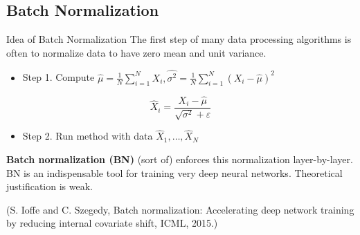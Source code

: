 \subsection{Batch Normalization}

\begin{frame}[allowframebreaks]

\begin{myconceptblock}{6.45}{Idea of Batch Normalization}
    The first step of many data processing algorithms is often to normalize data to have zero mean and unit variance.

    \begin{itemize}
        \item Step 1. Compute $\hat{\mu}=\frac{1}{N} \sum_{i=1}^{N} X_{i}, \widehat{\sigma^{2}}=\frac{1}{N} \sum_{i=1}^{N}\left(X_{i}-\hat{\mu}\right)^{2}$
    \end{itemize}

    $$
    \hat{X}_{i}=\frac{X_{i}-\widehat{\mu}}{\sqrt{\sigma^{2}}+\varepsilon}
    $$

    \begin{itemize}
        \item Step 2. Run method with data $\hat{X}_{1}, \ldots, \hat{X}_{N}$
    \end{itemize}

    \textbf{Batch normalization (BN)} (sort of) enforces this normalization layer-by-layer. BN is an indispensable tool for training very deep neural networks. Theoretical justification is weak.

    (S. Ioffe and C. Szegedy, Batch normalization: Accelerating deep network training by reducing internal covariate shift, ICML, 2015.)
\end{myconceptblock}

\end{frame}

